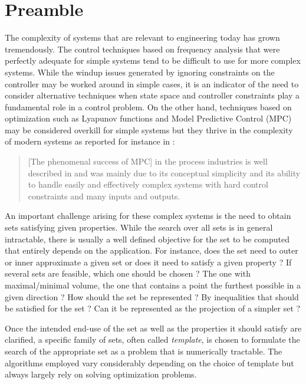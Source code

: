 \chapter*{Preamble}

The complexity of systems that are relevant to engineering today has grown tremendously.
The control techniques based on frequency analysis that were perfectly adequate for simple systems tend to be difficult to use for more complex systems.
While the windup issues generated by ignoring constraints on the controller may be worked around in simple cases,
it is an indicator of the need to consider alternative techniques when state space and controller constraints play a fundamental role in a control problem.
On the other hand, techniques based on optimization such as Lyapunov functions and Model Predictive Control (MPC) may be considered overkill for simple systems
but they thrive in the complexity of modern systems as reported for instance in \cite{mayne2014model}:
\begin{quote}
  [The phenomenal success of MPC] in the process industries is well described in \cite{qin2003survey} and was mainly due to
  its conceptual simplicity and its ability to handle easily and effectively
  complex systems with hard control constraints and many inputs and outputs.
\end{quote}

An important challenge arising for these complex systems is the need to obtain sets satisfying given properties.
While the search over all sets is in general intractable, there is usually a well defined objective for the set to be computed that entirely depends on the application.
For instance, does the set need to outer or inner approximate a given set or does it need to satisfy a given property ?
If several sets are feasible, which one should be chosen ? The one with maximal/minimal volume, the one that contains a point the furthest possible in a given direction ?
How should the set be represented ? By inequalities that should be satisfied for the set ? Can it be represented as the projection of a simpler set ?

Once the intended end-use of the set as well as the properties it should satisfy are clarified,
a specific family of sets, often called \emph{template}, is chosen to formulate the search of the appropriate set as a problem that is numerically tractable.
The algorithms employed vary considerably depending on the choice of template but always largely rely on solving optimization problems.

